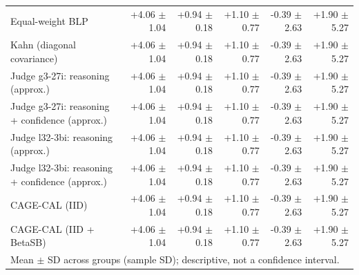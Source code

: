 \begin{tabular}{lrrrrr}
Equal-weight BLP & +4.06 {\scriptsize $\pm$ 1.04} & +0.94 {\scriptsize $\pm$ 0.18} & +1.10 {\scriptsize $\pm$ 0.77} & -0.39 {\scriptsize $\pm$ 2.63} & +1.90 {\scriptsize $\pm$ 5.27} \\
Kahn (diagonal covariance) & +4.06 {\scriptsize $\pm$ 1.04} & +0.94 {\scriptsize $\pm$ 0.18} & +1.10 {\scriptsize $\pm$ 0.77} & -0.39 {\scriptsize $\pm$ 2.63} & +1.90 {\scriptsize $\pm$ 5.27} \\
Judge g3-27i: reasoning (approx.) & +4.06 {\scriptsize $\pm$ 1.04} & +0.94 {\scriptsize $\pm$ 0.18} & +1.10 {\scriptsize $\pm$ 0.77} & -0.39 {\scriptsize $\pm$ 2.63} & +1.90 {\scriptsize $\pm$ 5.27} \\
Judge g3-27i: reasoning + confidence (approx.) & +4.06 {\scriptsize $\pm$ 1.04} & +0.94 {\scriptsize $\pm$ 0.18} & +1.10 {\scriptsize $\pm$ 0.77} & -0.39 {\scriptsize $\pm$ 2.63} & +1.90 {\scriptsize $\pm$ 5.27} \\
Judge l32-3bi: reasoning (approx.) & +4.06 {\scriptsize $\pm$ 1.04} & +0.94 {\scriptsize $\pm$ 0.18} & +1.10 {\scriptsize $\pm$ 0.77} & -0.39 {\scriptsize $\pm$ 2.63} & +1.90 {\scriptsize $\pm$ 5.27} \\
Judge l32-3bi: reasoning + confidence (approx.) & +4.06 {\scriptsize $\pm$ 1.04} & +0.94 {\scriptsize $\pm$ 0.18} & +1.10 {\scriptsize $\pm$ 0.77} & -0.39 {\scriptsize $\pm$ 2.63} & +1.90 {\scriptsize $\pm$ 5.27} \\
CAGE-CAL (IID) & +4.06 {\scriptsize $\pm$ 1.04} & +0.94 {\scriptsize $\pm$ 0.18} & +1.10 {\scriptsize $\pm$ 0.77} & -0.39 {\scriptsize $\pm$ 2.63} & +1.90 {\scriptsize $\pm$ 5.27} \\
CAGE-CAL (IID + BetaSB) & +4.06 {\scriptsize $\pm$ 1.04} & +0.94 {\scriptsize $\pm$ 0.18} & +1.10 {\scriptsize $\pm$ 0.77} & -0.39 {\scriptsize $\pm$ 2.63} & +1.90 {\scriptsize $\pm$ 5.27} \\
\bottomrule
\multicolumn{6}{l}{\scriptsize Mean $\pm$ SD across groups (sample SD); descriptive, not a confidence interval.} \\
\end{tabular}
